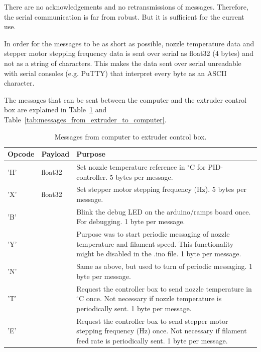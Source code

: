 \documentclass[10pt]{article}
\newcommand{\tabrowA}{\rowcolor{tabrowcolorA}}
\begin{document}
There are no acknowledgements and no retransmissions of messages. Therefore, the serial communication is far from robust. But it is sufficient for the current use.

In order for the messages to be as short as possible, nozzle temperature data and stepper motor stepping frequency data is sent over serial as float32 (4 bytes) and not as a string of characters. This makes the data sent over serial unreadable with serial consoles (e.g. PuTTY) that interpret every byte as an ASCII character.

The messages that can be sent between the computer and the extruder control box are explained in Table~\ref{tab:messages_from_computer_to_extruder} and Table~\ref{tab:messages_from_extruder_to_computer}.

\begin{table}[h]
	\centering
	{
	\captionsetup{width=\linewidth}
	\caption{Messages from computer to extruder control box.}
	\label{tab:messages_from_computer_to_extruder}
	}
	\vspace{-0.6em}
	\setlength\tabcolsep{6pt} %
	\begin{tabular}{>{\centering}p{0.065\linewidth}>{\centering}p{0.08\linewidth}
	p{0.865\linewidth}}
	\toprule
	Opcode & Payload & Purpose \\
	\midrule
	\tabrowA 'H' & float32 & Set nozzle temperature reference in $^\circ\text{C}$ for PID-controller. 5 bytes per message. \\[3pt]
	'X' & float32 & Set stepper motor stepping frequency ($\text{Hz}$). 5 bytes per message. \\[3pt]
	\tabrowA 'B' &  & Blink the debug LED on the arduino/ramps board once. For debugging. 1 byte per message. \\[3pt]
	'Y' &  & Purpose was to start periodic messaging of nozzle temperature and filament speed. This functionality might be disabled in the .ino file. 1 byte per message. \\[3pt]
	\tabrowA 'N' &  & Same as above, but used to turn of periodic messaging. 1 byte per message. \\[3pt]
	'T' &  & Request the controller box to send nozzle temperature in $^\circ\text{C}$ once. Not necessary if nozzle temperature is periodically sent. 1 byte per message. \\[3pt]
	\tabrowA 'E' &  & Request the controller box to send stepper motor stepping frequency ($\text{Hz}$) once. Not necessary if filament feed rate is periodically sent. 1 byte per message. \\[3pt]
	\bottomrule
	\end{tabular}
\end{table}
\end{document}
